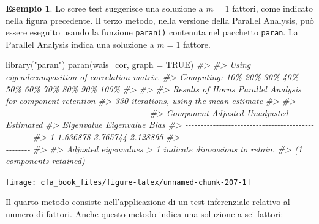 \documentclass[
  11pt,
]{krantz}
\makeatletter
\newenvironment{Shaded}{\begin{snugshade}}{\end{snugshade}}
\newcommand{\AttributeTok}[1]{\textcolor[rgb]{0.61,0.61,0.61}{#1}}
\newcommand{\CommentTok}[1]{\textcolor[rgb]{0.37,0.37,0.37}{\textit{#1}}}
\newcommand{\ConstantTok}[1]{\textcolor[rgb]{0,0,0}{#1}}
\newcommand{\FunctionTok}[1]{\textcolor[rgb]{0,0,0}{#1}}
\newcommand{\NormalTok}[1]{#1}
\newcommand{\StringTok}[1]{\textcolor[rgb]{0.5,0.5,0.5}{#1}}
\newenvironment{kframe}{%
\medskip{}
\setlength{\fboxsep}{.8em}
 \def\at@end@of@kframe{}%
 \ifinner\ifhmode%
  \def\at@end@of@kframe{\end{minipage}}%
  \begin{minipage}{\columnwidth}%
 \fi\fi%
 \def\FrameCommand##1{\hskip\@totalleftmargin \hskip-\fboxsep
 \colorbox{shadecolor}{##1}\hskip-\fboxsep
     \hskip-\linewidth \hskip-\@totalleftmargin \hskip\columnwidth}%
 \MakeFramed {\advance\hsize-\width
   \@totalleftmargin\z@ \linewidth\hsize
   \@setminipage}}%
 {\par\unskip\endMakeFramed%
 \at@end@of@kframe}
\renewenvironment{Shaded}{\begin{kframe}}{\end{kframe}}
\theoremstyle{definition}
\theoremstyle{definition}
\newtheorem{example}{Esempio}[chapter]
\theoremstyle{definition}
\theoremstyle{definition}
\theoremstyle{remark}
\makeatother
\begin{document}
\begin{example}
Lo scree test suggerisce una soluzione a \(m=1\) fattori, come indicato nella figura precedente. Il terzo metodo, nella versione della Parallel Analysis, può essere eseguito usando la funzione \texttt{paran()} contenuta nel pacchetto \texttt{paran}. La Parallel Analysis indica una soluzione a \(m=1\) fattore.

\begin{Shaded}
\begin{Highlighting}[]
\FunctionTok{library}\NormalTok{(}\StringTok{"paran"}\NormalTok{)}
\FunctionTok{paran}\NormalTok{(wais\_cor, }\AttributeTok{graph =} \ConstantTok{TRUE}\NormalTok{)}
\CommentTok{\#\textgreater{} }
\CommentTok{\#\textgreater{} Using eigendecomposition of correlation matrix.}
\CommentTok{\#\textgreater{} Computing: 10\%  20\%  30\%  40\%  50\%  60\%  70\%  80\%  90\%  100\%}
\CommentTok{\#\textgreater{} }
\CommentTok{\#\textgreater{} }
\CommentTok{\#\textgreater{} Results of Horn\textquotesingle{}s Parallel Analysis for component retention}
\CommentTok{\#\textgreater{} 330 iterations, using the mean estimate}
\CommentTok{\#\textgreater{} }
\CommentTok{\#\textgreater{} {-}{-}{-}{-}{-}{-}{-}{-}{-}{-}{-}{-}{-}{-}{-}{-}{-}{-}{-}{-}{-}{-}{-}{-}{-}{-}{-}{-}{-}{-}{-}{-}{-}{-}{-}{-}{-}{-}{-}{-}{-}{-}{-}{-}{-}{-}{-}{-}{-}{-} }
\CommentTok{\#\textgreater{} Component   Adjusted    Unadjusted    Estimated }
\CommentTok{\#\textgreater{}             Eigenvalue  Eigenvalue    Bias }
\CommentTok{\#\textgreater{} {-}{-}{-}{-}{-}{-}{-}{-}{-}{-}{-}{-}{-}{-}{-}{-}{-}{-}{-}{-}{-}{-}{-}{-}{-}{-}{-}{-}{-}{-}{-}{-}{-}{-}{-}{-}{-}{-}{-}{-}{-}{-}{-}{-}{-}{-}{-}{-}{-}{-} }
\CommentTok{\#\textgreater{} 1           1.636878    3.765744      2.128865}
\CommentTok{\#\textgreater{} {-}{-}{-}{-}{-}{-}{-}{-}{-}{-}{-}{-}{-}{-}{-}{-}{-}{-}{-}{-}{-}{-}{-}{-}{-}{-}{-}{-}{-}{-}{-}{-}{-}{-}{-}{-}{-}{-}{-}{-}{-}{-}{-}{-}{-}{-}{-}{-}{-}{-} }
\CommentTok{\#\textgreater{} }
\CommentTok{\#\textgreater{} Adjusted eigenvalues \textgreater{} 1 indicate dimensions to retain.}
\CommentTok{\#\textgreater{} (1 components retained)}
\end{Highlighting}
\end{Shaded}

\begin{center}\texttt{[image: cfa\_book\_files/figure-latex/unnamed-chunk-207-1]} \end{center}

Il quarto metodo consiste nell'applicazione di un test inferenziale relativo al numero di fattori. Anche questo metodo indica una soluzione a sei fattori:


\end{example}
\end{document}
